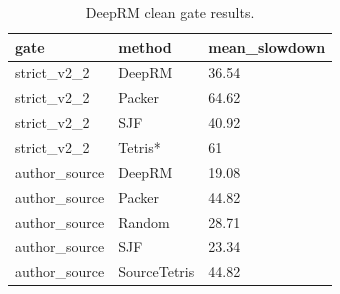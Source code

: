 \begin{table}[t]
\centering
\caption{DeepRM clean gate results.}
\begin{tabular}{lll}
\hline
gate & method & mean\_slowdown \\
\hline
strict\_v2\_2 & DeepRM & 36.54 \\
strict\_v2\_2 & Packer & 64.62 \\
strict\_v2\_2 & SJF & 40.92 \\
strict\_v2\_2 & Tetris* & 61 \\
author\_source & DeepRM & 19.08 \\
author\_source & Packer & 44.82 \\
author\_source & Random & 28.71 \\
author\_source & SJF & 23.34 \\
author\_source & SourceTetris & 44.82 \\
\hline
\end{tabular}
\end{table}
